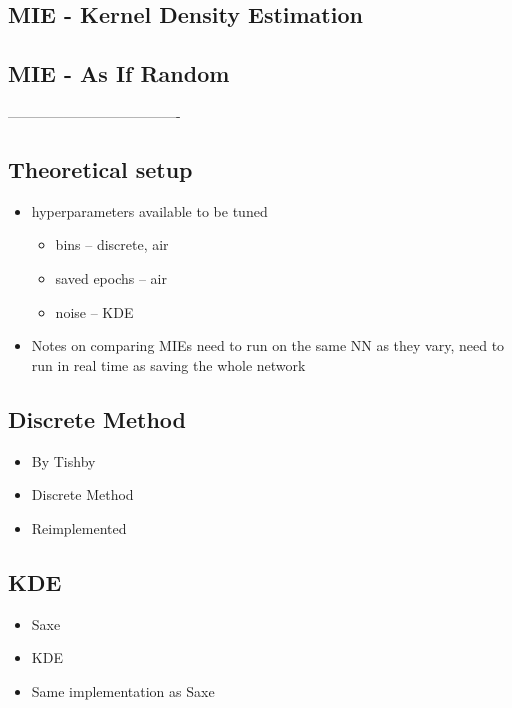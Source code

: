 \documentclass[dissertation.tex]{subfiles}
\begin{document}
\subsection{MIE - Kernel Density Estimation} \label{subKDE}
\subsection{MIE - As If Random} \label{subAIR}

-------------------------------------

\subsection{Theoretical setup}

\begin{itemize}
  \item{
      hyperparameters available to be tuned 
      \begin{itemize}
        \item{
            bins -- discrete, air
          }
        \item{
            saved epochs -- air
          }
        \item{
            noise -- KDE
          }
      \end{itemize}
    }
  \item{
      Notes on comparing MIEs need to run on the same NN as they vary, need to
      run in real time as saving the whole network
    }
\end{itemize}

\subsection{Discrete Method}

\begin{itemize}
  \item{
      By Tishby
    }
  \item{
      Discrete Method
    }
  \item{
      Reimplemented 
    }
\end{itemize}

\subsection{KDE}

\begin{itemize}
  \item{
      Saxe
    }
  \item{
      KDE
    }
  \item{
      Same implementation as Saxe
    }
\end{itemize}
\end{document}
